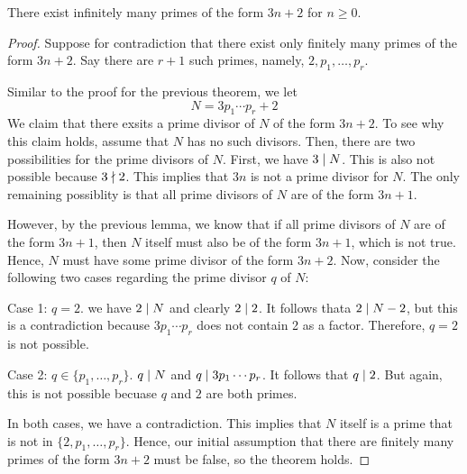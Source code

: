 \begin{theorem}
    There exist infinitely many primes of the form $3n+2$ for $n \geq 0$.
\end{theorem}

\begin{proof}
    Suppose for contradiction that there exist only finitely many primes of the form $3n + 2$. Say there are $r+1$ such primes, namely, $2,p_1,\ldots,p_r$.

    Similar to the proof for the previous theorem, we let
    $$
    N = 3p_1\cdots p_r + 2
    $$
    We claim that there exsits a prime divisor of $N$ of the form $3n+2$. To see why this claim holds, assume that $N$ has no such divisors. Then, there are two possibilities for the prime divisors of $N$. First, we have $3 \mathrel{\mid} N$. This is also not possible because $3 \mathrel{\nmid} 2$. This implies that $3n$ is not a prime divisor for $N$. The only remaining possiblity is that all prime divisors of $N$ are of the form $3n + 1$.

    However, by the previous lemma, we know that if all prime divisors of $N$ are of the form $3n + 1$, then $N$ itself must also be of the form $3n + 1$, which is not true. Hence, $N$ must have some prime divisor of the form $3n + 2$. Now, consider the following two cases regarding the prime divisor $q$ of $N$:

    Case 1: $q=2$. we have $2 \mathrel{\mid} N$ and clearly $2 \mathrel{\mid} 2$. It follows thata $2 \mathrel{\mid} N - 2$, but this is a contradiction because $3p_1\cdots p_r$ does not contain 2 as a factor. Therefore, $q=2$ is not possible.

    Case 2: $q \in \{p_1,\ldots,p_r\}$. $q \mathrel{\mid} N$ and $q \mathrel{\mid} 3p_1\cdots p_r$. It follows that $q \mathrel{\mid} 2$. But again, this is not possible becuase $q$ and $2$ are both primes.

    In both cases, we have a contradiction. This implies that $N$ itself is a prime that is not in $\{2,p_1,\ldots,p_r\}$. Hence, our initial assumption that there are finitely many primes of the form $3n + 2$ must be false, so the theorem holds.
\end{proof}